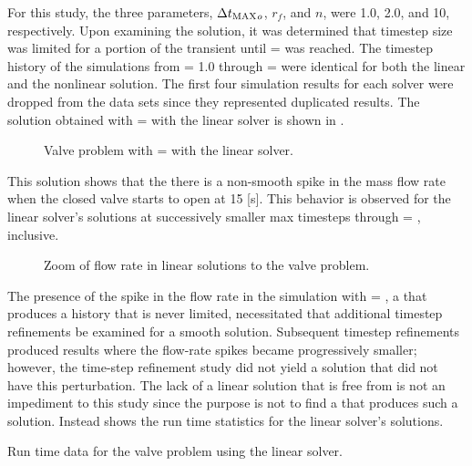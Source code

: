 For this study, the three parameters, $\dtmax{}_{o}$, $r_{f}$, and $n$, were 1.0, 2.0, and 10, respectively.
Upon examining the solution, it was determined that timestep size was \dtcrnt{} limited for a portion of the transient until \dtmax{} =  was reached.
The timestep history of the simulations from \dtmax{} = 1.0 through \dtmax{} =  were identical for both the linear and the nonlinear solution.
The first four simulation results for each solver were dropped from the data sets since they represented duplicated results.
The solution obtained with \dtmax{} =  with the linear solver is shown in .

\begin{figure}[h!t]
\centering

\caption{Valve problem with \dtmax{} =  with the linear solver.}
\label{fig:valveLin6pt25em02}
\end{figure}

This solution shows that the there is a non-smooth spike in the mass flow rate when the closed valve starts to open at 15 [s].
This behavior is observed for the linear solver's solutions at successively smaller max timesteps through \dtmax{} = , inclusive.

\begin{figure}[h!t]
\centering

\label{fig:valveLinSols}
\caption{Zoom of flow rate in linear solutions to the valve problem.}
\end{figure}

The presence of the spike in the flow rate in the simulation with \dtmax{} = , a \dtmax{} that produces a \dt{} history that is never \dtcrnt{} limited, necessitated that additional timestep refinements be examined for a smooth solution.
Subsequent timestep refinements produced results where the flow-rate spikes became progressively smaller; however, the time-step refinement study did not yield a solution that did not have this perturbation.
The lack of a linear solution that is free from is not an impediment to this study since the purpose is not to find a \dtmax{} that produces such a solution.
Instead  shows the run time statistics for the linear solver's solutions.

\begin{table}[h!t]
\centering
\singlespace

\caption{Run time data for the valve problem using the linear solver.}
\label{tab:valveLinTable}
\end{table}

